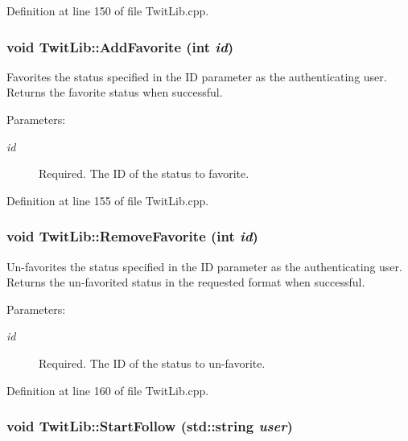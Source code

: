 Definition at line 150 of file TwitLib.cpp.\hypertarget{classTwitLib_d3caf78e988a99cdcc8ef8115afbc517}{
\subsubsection{\setlength{\rightskip}{0pt plus 5cm}void TwitLib::AddFavorite (int {\em id})}}
\label{classTwitLib_d3caf78e988a99cdcc8ef8115afbc517}


Favorites the status specified in the ID parameter as the authenticating user. Returns the favorite status when successful. \begin{Desc}
\item[Parameters:]
\begin{description}
\item[{\em id}]Required. The ID of the status to favorite. \end{description}
\end{Desc}


Definition at line 155 of file TwitLib.cpp.\hypertarget{classTwitLib_3cfdb83433fe9e5675bac209a6db01c6}{
\subsubsection{\setlength{\rightskip}{0pt plus 5cm}void TwitLib::RemoveFavorite (int {\em id})}}
\label{classTwitLib_3cfdb83433fe9e5675bac209a6db01c6}


Un-favorites the status specified in the ID parameter as the authenticating user. Returns the un-favorited status in the requested format when successful. \begin{Desc}
\item[Parameters:]
\begin{description}
\item[{\em id}]Required. The ID of the status to un-favorite. \end{description}
\end{Desc}


Definition at line 160 of file TwitLib.cpp.\hypertarget{classTwitLib_26c78a3d62971f17b9b61fbc413438ba}{
\subsubsection{\setlength{\rightskip}{0pt plus 5cm}void TwitLib::StartFollow (std::string {\em user})}}
\label{classTwitLib_26c78a3d62971f17b9b61fbc413438ba}


